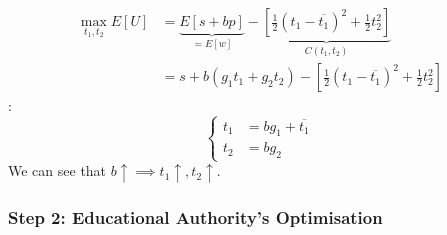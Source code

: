             \begin{align*}
                \max_{t_1,t_2} E[U] &= \underbrace{E[s+bp]}_{=E[w]} - \underbrace{\left[ \frac{1}{2}(t_1-\overline{t_1})^2 + \frac{1}{2}t_2^2 \right]}_{C(t_1,t_2)}\\
                &= s + b(g_1t_1 + g_2t_2) - \left[ \frac{1}{2}(t_1-\overline{t_1})^2 + \frac{1}{2}t_2^2 \right]
            \end{align*}
            :
            \begin{equation}
                \begin{cases}
                    t_1 &= bg_1 + \overline{t_1} \\
                    t_2 &= bg_2
                \end{cases}
                \label{eqn:edu_teacher_opt}
            \end{equation}
            We can see that $b\uparrow \implies t_1\uparrow, t_2\uparrow$.
            
        \subsubsection{Step 2: Educational Authority's Optimisation}
        
